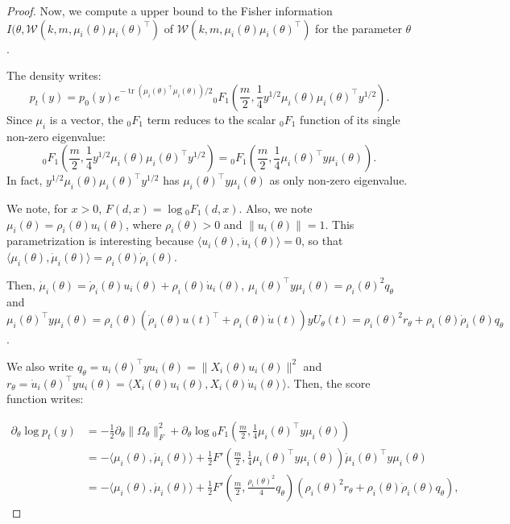 \documentclass{article}
\theoremstyle{plain}
\theoremstyle{definition}
\theoremstyle{remark}
\DeclareMathOperator{\tr}{tr}
\begin{document}
\begin{proof}
Now, we compute a upper bound to the Fisher information $I(\theta, \mathcal{W}(k,m,\mu_i(\theta) \mu_i(\theta)^\top)$ of $ \mathcal{W}(k,m,\mu_i(\theta) \mu_i(\theta)^\top)$ for the parameter $\theta$.

The density writes:
\[p_t(y) = p_0(y)e^{-\tr(\mu_i(\theta)^\top \mu_i(\theta))/2} {}_0F_1\left( \frac{m}{2}, \frac{1}{4} y^{1/2} \mu_i(\theta) \mu_i(\theta)^\top y^{1/2}\right).\]
Since $\mu_i$ is a vector, the ${}_0F_1$ term reduces to the scalar ${}_0F_1$ function of its single non-zero eigenvalue:
\[{}_0F_1\left( \frac{m}{2}, \frac{1}{4} y^{1/2} \mu_i(\theta) \mu_i(\theta)^\top y^{1/2}\right) = {}_0F_1\left( \frac{m}{2}, \frac{1}{4} \mu_i(\theta)^\top y \mu_i(\theta) \right).\]
In fact, $y^{1/2} \mu_i(\theta) \mu_i(\theta)^\top y^{1/2}$ has $\mu_i(\theta)^\top y \mu_i(\theta)$ as only non-zero eigenvalue. 

We note, for $x > 0$, $F(d,x) = \log {}_0F_1(d,x)$. Also, we note $\mu_i(\theta) = \rho_i(\theta) u_i(\theta)$, where $\rho_i(\theta) > 0$ and $\|u_i(\theta)\| = 1$. This parametrization is interesting because $\langle u_i(\theta) ,\dot u_i(\theta) \rangle = 0$, so that $\langle \mu_i(\theta), \dot \mu_i(\theta)\rangle = \rho_i(\theta)\dot\rho_i(\theta)$.

Then, $\dot \mu_i(\theta) = \dot \rho_i(\theta) u_i(\theta) + \rho_i(\theta) \dot u_i(\theta)$, $\mu_i(\theta)^\top y \mu_i(\theta) = \rho_i(\theta)^2 q_\theta$ and $\mu_i(\theta)^\top y \mu_i(\theta) = \rho_i(\theta) (\dot\rho_i(\theta) u(t)^\top + \rho_i(\theta) \dot u(t))y U_\theta(t) = \rho_i(\theta)^2 r_\theta + \rho_i(\theta)\dot \rho_i(\theta) q_\theta$.

 We also write $q_\theta = u_i(\theta)^\top y u_i(\theta) = \|X_i(\theta) u_i(\theta)\|^2$ and $r_\theta = \dot u_i(\theta)^\top y u_i(\theta) = \langle X_i(\theta)u_i(\theta), X_i(\theta) \dot u_i(\theta)\rangle$. 
Then, the score function writes:

\begin{align*}
    \partial_\theta \log p_t (y) &= -\frac{1}{2}\partial_\theta \|\Omega_\theta\|_F^2 +\partial_\theta \log {}_0F_1\left( \frac{m}{2},  \frac{1}{4} \mu_i(\theta)^\top y \mu_i(\theta) \right) \\&= -\langle \mu_i(\theta),\dot \mu_i(\theta)\rangle + \frac{1}{2}F'\left( \frac{m}{2},  \frac{1}{4} \mu_i(\theta)^\top y \mu_i(\theta) \right) \dot \mu_i(\theta)^\top y \mu_i(\theta)\\
    &= -\langle \mu_i(\theta),\dot \mu_i(\theta)\rangle + \frac{1}{2}F'\left(\frac{m}{2}, \frac{\rho_i(\theta)^2}{4} q_\theta \right) (\rho_i(\theta)^2 r_\theta + \rho_i(\theta)\dot \rho_i(\theta) q_\theta),
\end{align*}


\end{proof}
\end{document}
